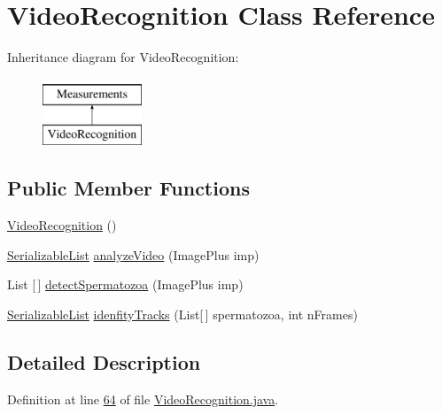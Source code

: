 \hypertarget{classfunctions_1_1_video_recognition}{}\section{Video\+Recognition Class Reference}
\label{classfunctions_1_1_video_recognition}
Inheritance diagram for Video\+Recognition\+:\begin{figure}[H]
\begin{center}
\leavevmode
\includegraphics[height=2.000000cm]{classfunctions_1_1_video_recognition}
\end{center}
\end{figure}
\subsection*{Public Member Functions}
\begin{DoxyCompactItemize}
\item 
\hyperlink{classfunctions_1_1_video_recognition_a7901d0cc46df7762032f67cd822e30a5}{Video\+Recognition} ()
\item 
\hyperlink{classdata_1_1_serializable_list}{Serializable\+List} \hyperlink{classfunctions_1_1_video_recognition_a5472ba1ca2aba8ebc35bcb63634421e1}{analyze\+Video} (Image\+Plus imp)
\item 
List \mbox{[}$\,$\mbox{]} \hyperlink{classfunctions_1_1_video_recognition_a08fc1c8ff56553233cab77b1dea7b978}{detect\+Spermatozoa} (Image\+Plus imp)
\item 
\hyperlink{classdata_1_1_serializable_list}{Serializable\+List} \hyperlink{classfunctions_1_1_video_recognition_a31e3f4ea058db30f6dc0bd3d192d6b4b}{idenfity\+Tracks} (List\mbox{[}$\,$\mbox{]} spermatozoa, int n\+Frames)
\end{DoxyCompactItemize}


\subsection{Detailed Description}


Definition at line \hyperlink{_video_recognition_8java_source_l00064}{64} of file \hyperlink{_video_recognition_8java_source}{Video\+Recognition.\+java}.



